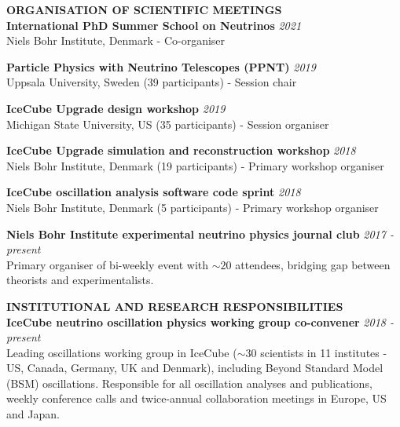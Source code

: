 \documentclass[a4paper,11pt]{article}
\renewcommand{\smallskip} {\vspace{0.1in}}
\begin{document}
\vspace{0.2cm}
\textbf{ORGANISATION OF SCIENTIFIC MEETINGS ~~\hrulefill}\smallskip\\
%
{\bf International PhD Summer School on Neutrinos} \hfill {\em 2021} \\ 
  Niels Bohr Institute, Denmark - Co-organiser
  
{\bf Particle Physics with Neutrino Telescopes (PPNT)} \hfill {\em 2019} \\ 
  Uppsala University, Sweden (39 participants) - Session chair
  
{\bf IceCube Upgrade design workshop} \hfill {\em 2019} \\ 
  Michigan State University, US (35 participants) - Session organiser

{\bf IceCube Upgrade simulation and reconstruction workshop} \hfill {\em 2018} \\ 
  Niels Bohr Institute, Denmark (19 participants) - Primary workshop organiser

{\bf IceCube oscillation analysis software code sprint} \hfill {\em 2018} \\ 
  Niels Bohr Institute, Denmark (5 participants) - Primary workshop organiser

{\bf Niels Bohr Institute experimental neutrino physics journal club} \hfill {\em 2017 - present} \\ 
Primary organiser of bi-weekly event with $\sim20$ attendees, bridging gap between theorists and experimentalists.

  
\vspace{0.2cm}
\textbf{INSTITUTIONAL AND RESEARCH RESPONSIBILITIES ~~\hrulefill}\smallskip\\
%
{\bf IceCube neutrino oscillation physics working group co-convener} \hfill {\em 2018 - present} \\ 
Leading oscillations working group in IceCube ($\sim$30 scientists in 11 institutes - US, Canada, Germany, UK and Denmark), including Beyond Standard Model (BSM) oscillations. Responsible for all oscillation analyses and publications, weekly conference calls and twice-annual collaboration meetings in Europe, US and Japan. 
\end{document}
